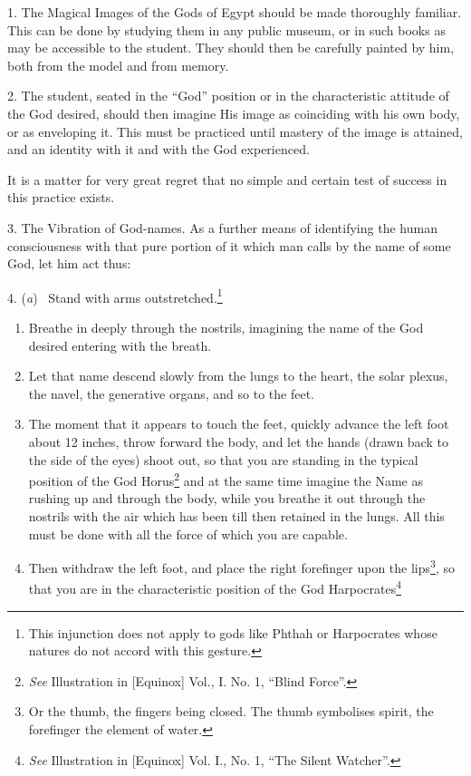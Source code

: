 

1. The Magical Images of the Gods of Egypt should be made thoroughly familiar. This can be done by studying them in any public museum, or in such books as may be accessible to the student. They should then be carefully painted by him, both from the model and from memory.

2. The student, seated in the \enquote{God} position or in the characteristic attitude of the God desired, should then imagine His image as coinciding with his own body, or as enveloping it. This must be practiced until mastery of the image is attained, and an identity with it and with the God experienced.

It is a matter for very great regret that no simple and certain test of success in this practice exists.

3. The Vibration of God-names. As a further means of identifying the human consciousness with that pure portion of it which man calls by the name of some God, let him act thus:

4. (\textit{a}) \-\ Stand with arms outstretched.\footnote{This injunction does not apply to gods like Phthah or Harpocrates whose natures do not accord with this gesture.} \begin{enumerate}[start=2, label=(\textit{\alph*}), leftmargin=3.57\parindent]
\item Breathe in deeply through the nostrils, imagining the name of the God desired entering with the breath.
\item Let that name descend slowly from the lungs to the heart, the solar plexus, the navel, the generative organs, and so to the feet.
\item The moment that it appears to touch the feet, quickly advance the left foot about 12 inches, throw forward the body, and let the hands (drawn back to the side of the eyes) shoot out, so that you are standing in the typical position of the God Horus\footnote{\textit{See} Illustration in [Equinox] Vol., I. No. 1, \enquote{Blind Force}.} and at the same time imagine the Name as rushing up and through the body, while you breathe it out through the nostrils with the air which has been till then retained in the lungs. All this must be done with all the force of which you are capable.
\item Then withdraw the left foot, and place the right forefinger upon the lips\footnote{Or the thumb, the fingers being closed. The thumb symbolises spirit, the forefinger the element of water.}, so that you are in the characteristic position of the God Harpocrates\footnote{\textit{See} Illustration in [Equinox] Vol. I., No. 1, \enquote{The Silent Watcher}.}
\end{enumerate}

